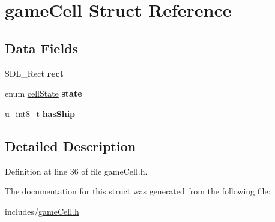 \hypertarget{structgame_cell}{}\section{game\+Cell Struct Reference}
\label{structgame_cell}
\subsection*{Data Fields}
\begin{DoxyCompactItemize}
\item 
\mbox{\label{structgame_cell_a55aefd071649ac9dd8133e2d8a52d11f}} 
S\+D\+L\+\_\+\+Rect {\bfseries rect}
\item 
\mbox{\label{structgame_cell_a058f4c912c8378ad76523861b1e0ad4b}} 
enum \hyperlink{game_cell_8h_a38e97bf4503f8099c49fac77b951ae63}{cell\+State} {\bfseries state}
\item 
\mbox{\label{structgame_cell_a9dda3ce5e0a6197a2a5a675340b1e1cb}} 
u\+\_\+int8\+\_\+t {\bfseries has\+Ship}
\end{DoxyCompactItemize}


\subsection{Detailed Description}


Definition at line 36 of file game\+Cell.\+h.



The documentation for this struct was generated from the following file\+:\begin{DoxyCompactItemize}
\item 
includes/\hyperlink{game_cell_8h}{game\+Cell.\+h}\end{DoxyCompactItemize}
